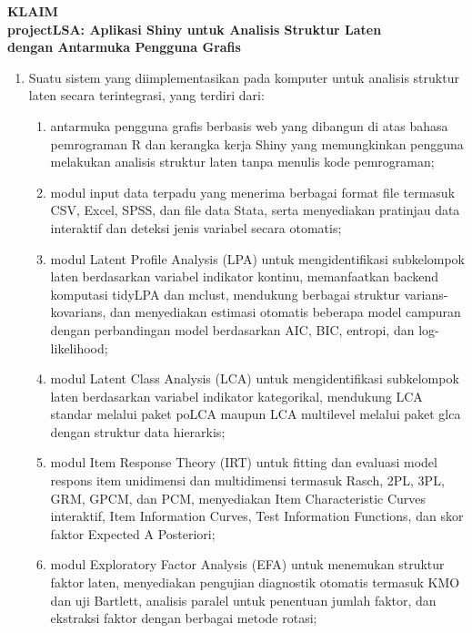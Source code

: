 \documentclass[12pt,a4paper]{article}
\begin{document}
\begin{center}
\textbf{\large KLAIM}\\[12pt]
\textbf{projectLSA: Aplikasi Shiny untuk Analisis Struktur Laten\\dengan Antarmuka Pengguna Grafis}
\end{center}

\vspace{12pt}

\begin{enumerate}[leftmargin=3em, labelsep=1em, itemsep=12pt]

\item Suatu sistem yang diimplementasikan pada komputer untuk analisis struktur laten secara terintegrasi, yang terdiri dari:
\begin{enumerate}[label=\alph*., leftmargin=2em, itemsep=2pt]
\item antarmuka pengguna grafis berbasis web yang dibangun di atas bahasa pemrograman R dan kerangka kerja Shiny yang memungkinkan pengguna melakukan analisis struktur laten tanpa menulis kode pemrograman;
\item modul input data terpadu yang menerima berbagai format file termasuk CSV, Excel, SPSS, dan file data Stata, serta menyediakan pratinjau data interaktif dan deteksi jenis variabel secara otomatis;
\item modul Latent Profile Analysis (LPA) untuk mengidentifikasi subkelompok laten berdasarkan variabel indikator kontinu, memanfaatkan backend komputasi tidyLPA dan mclust, mendukung berbagai struktur varians-kovarians, dan menyediakan estimasi otomatis beberapa model campuran dengan perbandingan model berdasarkan AIC, BIC, entropi, dan log-likelihood;
\item modul Latent Class Analysis (LCA) untuk mengidentifikasi subkelompok laten berdasarkan variabel indikator kategorikal, mendukung LCA standar melalui paket poLCA maupun LCA multilevel melalui paket glca dengan struktur data hierarkis;
\item modul Item Response Theory (IRT) untuk fitting dan evaluasi model respons item unidimensi dan multidimensi termasuk Rasch, 2PL, 3PL, GRM, GPCM, dan PCM, menyediakan Item Characteristic Curves interaktif, Item Information Curves, Test Information Functions, dan skor faktor Expected A Posteriori;
\item modul Exploratory Factor Analysis (EFA) untuk menemukan struktur faktor laten, menyediakan pengujian diagnostik otomatis termasuk KMO dan uji Bartlett, analisis paralel untuk penentuan jumlah faktor, dan ekstraksi faktor dengan berbagai metode rotasi;

\end{enumerate}
\end{enumerate}
\end{document}
